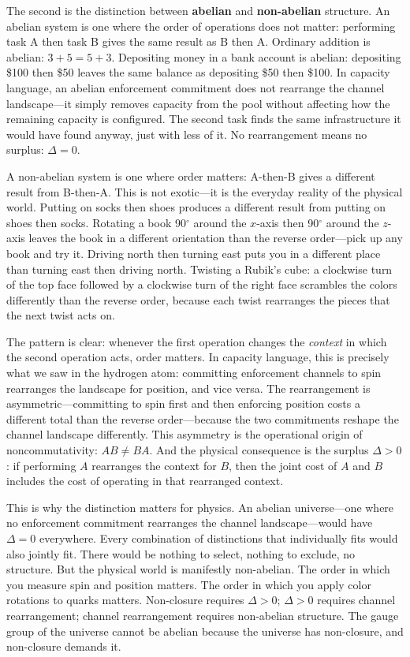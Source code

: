 \documentclass[11pt]{article}
\begin{document}
The second is the distinction between \textbf{abelian} and \textbf{non-abelian} structure.  An abelian system is one where the order of operations does not matter: performing task A then task B gives the same result as B then A.  Ordinary addition is abelian: $3 + 5 = 5 + 3$.  Depositing money in a bank account is abelian: depositing \$100 then \$50 leaves the same balance as depositing \$50 then \$100.  In capacity language, an abelian enforcement commitment does not rearrange the channel landscape---it simply removes capacity from the pool without affecting how the remaining capacity is configured.  The second task finds the same infrastructure it would have found anyway, just with less of it.  No rearrangement means no surplus: $\Delta = 0$.

A non-abelian system is one where order matters: A-then-B gives a different result from B-then-A.  This is not exotic---it is the everyday reality of the physical world.  Putting on socks then shoes produces a different result from putting on shoes then socks.  Rotating a book 90$^\circ$ around the $x$-axis then 90$^\circ$ around the $z$-axis leaves the book in a different orientation than the reverse order---pick up any book and try it.  Driving north then turning east puts you in a different place than turning east then driving north.  Twisting a Rubik's cube: a clockwise turn of the top face followed by a clockwise turn of the right face scrambles the colors differently than the reverse order, because each twist rearranges the pieces that the next twist acts on.

The pattern is clear: whenever the first operation changes the \emph{context} in which the second operation acts, order matters.  In capacity language, this is precisely what we saw in the hydrogen atom: committing enforcement channels to spin rearranges the landscape for position, and vice versa.  The rearrangement is asymmetric---committing to spin first and then enforcing position costs a different total than the reverse order---because the two commitments reshape the channel landscape differently.  This asymmetry is the operational origin of noncommutativity: $AB \ne BA$.  And the physical consequence is the surplus $\Delta > 0$: if performing $A$ rearranges the context for $B$, then the joint cost of $A$ and $B$ includes the cost of operating in that rearranged context.

This is why the distinction matters for physics.  An abelian universe---one where no enforcement commitment rearranges the channel landscape---would have $\Delta = 0$ everywhere.  Every combination of distinctions that individually fits would also jointly fit.  There would be nothing to select, nothing to exclude, no structure.  But the physical world is manifestly non-abelian.  The order in which you measure spin and position matters.  The order in which you apply color rotations to quarks matters.  Non-closure requires $\Delta > 0$; $\Delta > 0$ requires channel rearrangement; channel rearrangement requires non-abelian structure.  The gauge group of the universe cannot be abelian because the universe has non-closure, and non-closure demands it.
\end{document}
